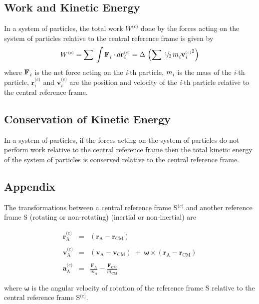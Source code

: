 \documentclass[10pt]{article}
\newcommand{\mm}{m}
\newcommand{\mW}{W}
\newcommand{\vR}{\mathbf{r}}
\newcommand{\vV}{\mathbf{v}}
\newcommand{\vA}{\mathbf{a}}
\newcommand{\vF}{\mathbf{F}}
\newcommand{\ri}{_{\scriptstyle \mathit i}}
\newcommand{\ra}{_{\scriptscriptstyle \mathrm A}}
\newcommand{\rc}{^{\scriptscriptstyle \mathrm (c)}}
\newcommand{\rs}{_{\scriptscriptstyle \mathrm {CM}}}
\newcommand{\med}{\raise.5ex\hbox{$\scriptstyle 1$}\kern-.15em/\kern-.15em\lower.25ex\hbox{$\scriptstyle 2$}}
\begin{document}
\newpage

{\centering\subsection*{Work and Kinetic Energy}}

\par In a system of particles, the total work $\mW\rc$ done by the forces acting on the system of particles relative to the central reference frame is given by
\begin{eqnarray*}
\mW\rc = \sum \: \int{\vF\ri^{\vphantom{\scriptscriptstyle \mathrm (c)}} \cdot d\vR\ri\rc} = \Delta \, \left( \sum \: \med \, {\mm\ri^{\vphantom{\scriptscriptstyle \mathrm (c)}}}{\vV\ri\rc}^2 \right)
\end{eqnarray*}
\noindent where ${\vF\ri^{\vphantom{\scriptscriptstyle \mathrm (c)}}}$ is the net force acting on the \textit{i}-th particle, ${\mm\ri^{\vphantom{\scriptscriptstyle \mathrm (c)}}}$ is the mass of the \textit{i}-th particle, $\vR\ri\rc$ and $\vV\ri\rc$ are the position and velocity of the \textit{i}-th particle relative to the central reference frame.

\vspace{+0.6em}

{\centering\subsection*{Conservation of Kinetic Energy}}

\par In a system of particles, if the forces acting on the system of particles do not perform work relative to the central reference frame then the total kinetic energy of the system of particles is conserved relative to the central reference frame.

\vspace{+0.6em}

{\centering\subsection*{Appendix}}

\par The transformations between a central reference frame S$\rc$ and another reference frame S (rotating or non-rotating) (inertial or non-inertial) are

\vspace{-0.6em}

\begin{eqnarray*}
\vR\ra\rc & = & (\vR\ra - \vR\rs) \\ \\
\vV\ra\rc & = & (\vV\ra - \vV\rs) \; + \; {\mathbf{\omega}} \times (\vR\ra - \vR\rs) \\ \\
\vA\ra\rc & = & \frac{\vF\ra}{\mm\ra} - \frac{\vF\rs}{\mm\rs}
\end{eqnarray*}
\smallskip
\par \noindent where ${\mathbf{\omega}}$ is the angular velocity of rotation of the reference frame S relative to the central reference frame S$\rc$.
\end{document}
